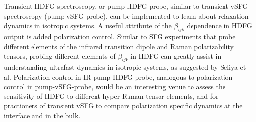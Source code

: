\documentclass[aip, jcp, reprint, onecolumn]{revtex4-2}
\begin{document}

Transient HDFG spectroscopy, or pump-HDFG-probe, similar to transient vSFG spectroscopy (pump-vSFG-probe), can be implemented to learn about relaxation dynamics in isotropic systems. \cite{RN224, Bonn2024}
A useful attribute of the $\beta_{ijk}$ dependence in HDFG output is added polarization control. 
Similar to SFG experiments that probe different elements of the infrared transition dipole and Raman polarizability tensors, probing different elements of $\beta_{ijk}$ in HDFG can greatly assist in understanding ultrafast dynamics in isotropic systems, as suggested by Seliya et al. \cite{Shen90, RN224, Bonn2024}
Polarization control in IR-pump-HDFG-probe, analogous to polarization control in pump-vSFG-probe, would be an interesting venue to assess the sensitivity of HDFG to different hyper-Raman tensor elements, and for practioners of transient vSFG to compare polarization specific dynamics at the interface and in the bulk. 
\end{document}
